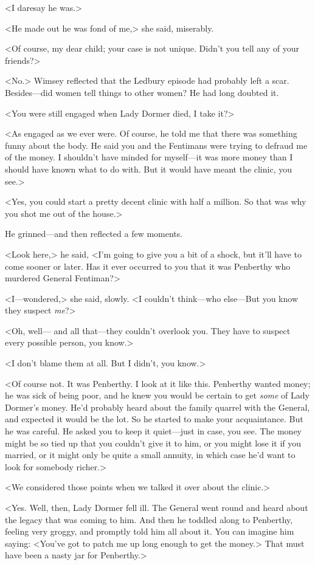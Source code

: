 <I daresay he was.>

<He made out he was fond of me,> she said, miserably.

<Of course, my dear child; your case is not unique. Didn't you tell any of your friends?>

<No.> Wimsey reflected that the Ledbury episode had probably left a scar. Besides—did women tell things to other women? He had long doubted it.

<You were still engaged when Lady Dormer died, I take it?>

<As engaged as we ever were. Of course, he told me that there was something funny about the body. He said you and the Fentimans were trying to defraud me of the money. I shouldn't have minded for myself—it was more money than I should have known what to do with. But it would have meant the clinic, you see.>

<Yes, you could start a pretty decent clinic with half a million. So that was why you shot me out of the house.>

He grinned—and then reflected a few moments.

<Look here,> he said, <I'm going to give you a bit of a shock, but it'll have to come sooner or later. Has it ever occurred to you that it was Penberthy who murdered General Fentiman?>

<I—wondered,> she said, slowly. <I couldn't think—who else—But you know they suspect \emph{me}?>

<Oh, well— and all that—they couldn't overlook you. They have to suspect every possible person, you know.>

<I don't blame them at all. But I didn't, you know.>

<Of course not. It was Penberthy. I look at it like this. Penberthy wanted money; he was sick of being poor, and he knew you would be certain to get \emph{some} of Lady Dormer's money. He'd probably heard about the family quarrel with the General, and expected it would be the lot. So he started to make your acquaintance. But he was careful. He asked you to keep it quiet—just in case, you see. The money might be so tied up that you couldn't give it to him, or you might lose it if you married, or it might only be quite a small annuity, in which case he'd want to look for somebody richer.>

<We considered those points when we talked it over about the clinic.>

<Yes. Well, then, Lady Dormer fell ill. The General went round and heard about the legacy that was coming to him. And then he toddled along to Penberthy, feeling very groggy, and promptly told him all about it. You can imagine him saying: <You've got to patch me up long enough to get the money.> That must have been a nasty jar for Penberthy.>

